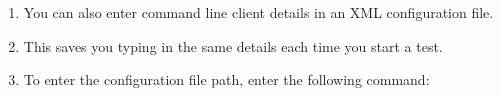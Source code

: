 
\begin{enumerate}
\item You can also enter command line client details in an XML configuration file.
\item This saves you typing in the same details each time you start a test.
\item To enter the configuration file path, enter the following command:\\


\end{enumerate}
